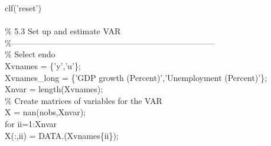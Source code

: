\hspace{1mm}\hspace{5mm} clf(\textcolor{matlabpurple}{'reset'}) \\ 
\hspace{1mm}\hspace{5mm}  \\ 
\hspace{1mm}\hspace{5mm} \textcolor{matlabgreen}{\% 5.3 Set up and estimate VAR }\\ 
\hspace{1mm}\hspace{5mm} \textcolor{matlabgreen}{\%--------------------------------------------------------------------------  }\\ 
\hspace{1mm}\hspace{5mm} \textcolor{matlabgreen}{\% Select endo }\\ 
\hspace{1mm}\hspace{5mm} Xvnames      = \{\textcolor{matlabpurple}{'y'},\textcolor{matlabpurple}{'u'}\}; \\ 
\hspace{1mm}\hspace{5mm} Xvnames\_long = \{\textcolor{matlabpurple}{'GDP growth (Percent)'},\textcolor{matlabpurple}{'Unemployment (Percent)'}\}; \\ 
\hspace{1mm}\hspace{5mm} Xnvar        = length(Xvnames); \\ 
\hspace{1mm}\hspace{5mm} \textcolor{matlabgreen}{\% Create matrices of variables \textcolor{matlabblue}{for} the VAR }\\ 
\hspace{1mm}\hspace{5mm} \hspace{5mm} X = nan(nobs,Xnvar); \\ 
\hspace{1mm}\hspace{5mm} \hspace{5mm} \textcolor{matlabblue}{for} ii=1:Xnvar \\ 
\hspace{1mm}\hspace{5mm} \hspace{5mm} \hspace{5mm} X(:,ii) = DATA.(Xvnames\{ii\}); \\ 
